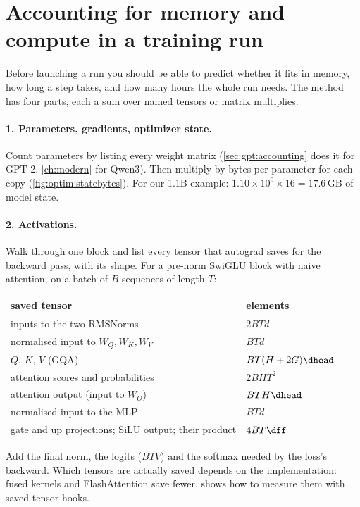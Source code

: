 \section{Accounting for memory and compute in a training run}\label{sec:optim:account}

Before launching a run you should be able to predict whether it fits in memory, how long a step
takes, and how many hours the whole run needs. The method has four parts, each a sum over
named tensors or matrix multiplies.

\paragraph{1. Parameters, gradients, optimizer state.} Count parameters by listing every
weight matrix (\cref{sec:gpt:accounting} does it for GPT-2, \cref{ch:modern} for Qwen3). Then
multiply by bytes per parameter for each copy (\cref{fig:optim:statebytes}). For our 1.1B example:
$1.10\times10^9\times16 = 17.6$\,GB of model state.

\paragraph{2. Activations.} Walk through one block and list every tensor that autograd saves
for the backward pass, with its shape. For a pre-norm SwiGLU block with naive attention, on a
batch of $B$ sequences of length $T$:
\begin{center}\small
\begin{tabular}{@{}ll@{}}
\toprule
saved tensor & elements \\
\midrule
inputs to the two RMSNorms & $2BTd$ \\
normalised input to $W_Q,W_K,W_V$ & $BTd$ \\
$Q$, $K$, $V$ (GQA) & $BT(H+2G)\dhead$ \\
attention scores and probabilities & $2BHT^2$ \\
attention output (input to $W_O$) & $BTH\dhead$ \\
normalised input to the MLP & $BTd$ \\
gate and up projections; SiLU output; their product & $4BT\dff$ \\
\bottomrule
\end{tabular}
\end{center}
Add the final norm, the logits ($BTV$) and the softmax needed by the loss's backward. Which
tensors are actually saved depends on the implementation: fused kernels and FlashAttention save
fewer.  shows how to measure them with saved-tensor hooks.

